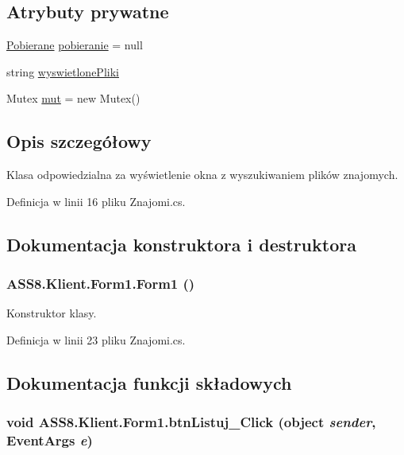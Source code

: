 \subsection*{Atrybuty prywatne}
\begin{CompactItemize}
\item 
\hyperlink{a00019}{Pobierane} \hyperlink{a00003_a21006ffcd0ae9b655d6232326c0783e}{pobieranie} = null
\item 
string \hyperlink{a00003_8647bc097f5550069c2ffa260182726e}{wyswietlonePliki}
\item 
Mutex \hyperlink{a00003_26249d134376a8c1b9be63c9a2df68a2}{mut} = new Mutex()
\end{CompactItemize}


\subsection{Opis szczegółowy}
Klasa odpowiedzialna za wyświetlenie okna z wyszukiwaniem plików znajomych. 



Definicja w linii 16 pliku Znajomi.cs.

\subsection{Dokumentacja konstruktora i destruktora}
\hypertarget{a00003_f4f57fa006228bda67e1478113bbd3bd}{
\subsubsection[{Form1}]{\setlength{\rightskip}{0pt plus 5cm}ASS8.Klient.Form1.Form1 ()}}
\label{d1/d7c/a00003_f4f57fa006228bda67e1478113bbd3bd}


Konstruktor klasy. 



Definicja w linii 23 pliku Znajomi.cs.

\subsection{Dokumentacja funkcji składowych}
\hypertarget{a00003_e934f222567288447b30be318da95ba7}{
\subsubsection[{btnListuj\_\-Click}]{\setlength{\rightskip}{0pt plus 5cm}void ASS8.Klient.Form1.btnListuj\_\-Click (object {\em sender}, \/  EventArgs {\em e})}}
\label{d1/d7c/a00003_e934f222567288447b30be318da95ba7}


